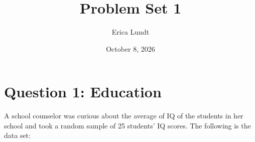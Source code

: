 \documentclass[12pt,letterpaper]{article}
\title{Problem Set 1}
\author{Erica Lundt}
\date{October 8, 2026}
\begin{document}
	\maketitle
	
	\vspace{1cm}
	\section*{Question 1: Education}

A school counselor was curious about the average of IQ of the students in her school and took a random sample of 25 students' IQ scores. The following is the data set:\\
\vspace{.5cm}




\vspace{1cm}
\end{document}
